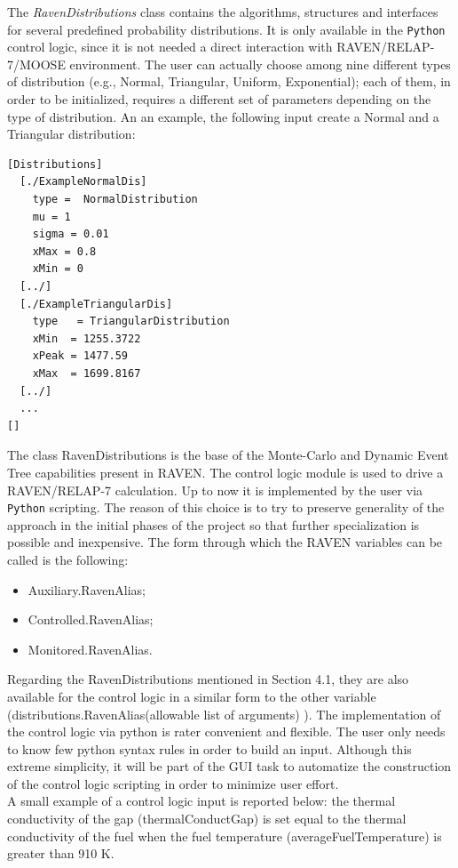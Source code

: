 \documentclass{mc2013}
\begin{document}
The \emph{RavenDistributions} class contains the algorithms, structures and interfaces for several predefined probability distributions. It is only available in the \verb!Python! control logic, since it is not needed a direct interaction with RAVEN/RELAP-7/MOOSE environment. The user can actually choose among nine different types of distribution (e.g., Normal, Triangular, Uniform, Exponential); each of them, in order to be initialized, requires a different set of parameters depending on the type of distribution.
An an example, the following input create a Normal and a Triangular distribution:
\begin{lstlisting}
[Distributions]
  [./ExampleNormalDis]
    type =  NormalDistribution
    mu = 1
    sigma = 0.01
    xMax = 0.8
    xMin = 0
  [../]
  [./ExampleTriangularDis]
    type   = TriangularDistribution
    xMin  = 1255.3722 
    xPeak = 1477.59
    xMax  = 1699.8167 
  [../]
  ...
[]
\end{lstlisting}
The class RavenDistributions is the base of the Monte-Carlo and Dynamic Event Tree capabilities present in RAVEN. 
\label{sec:pythonControlLogic} 
The control logic module is used to drive a RAVEN/RELAP-7 calculation. Up to now it is implemented by the user via \verb!Python! scripting. The reason of this choice is to try to preserve generality of the approach in the initial phases of the project so that further specialization is possible and  inexpensive.  
The form through which the RAVEN variables can be called is the following:
\begin{itemize}
  \item Auxiliary.RavenAlias;
  \item Controlled.RavenAlias;
  \item Monitored.RavenAlias.
\end{itemize}
Regarding the RavenDistributions mentioned in Section 4.1, they are also available for the control logic in a similar form to the other variable (distributions.RavenAlias(allowable list of arguments) ).
The implementation of the control logic via python is rater convenient and flexible. The user only needs to know few python syntax rules in order to build an input. Although this extreme simplicity, it will be part of the GUI task to automatize the construction of the control logic scripting in order to minimize user effort. 
\\A small example of a control logic input is reported below: the thermal conductivity of the gap (thermalConductGap) is set equal to the thermal conductivity of the fuel when the fuel temperature (averageFuelTemperature) is greater than 910 K.
\end{document}
